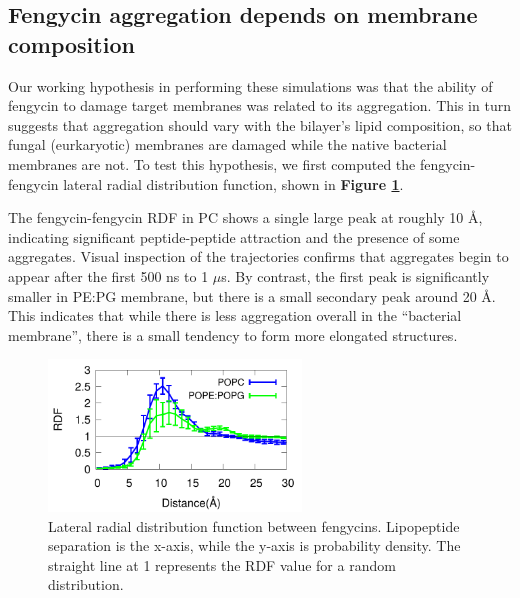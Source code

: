 \subsection{Fengycin aggregation depends on membrane composition}
\label{subsec:fengxyrdf}
Our working hypothesis in performing these simulations was that the ability of
fengycin to damage target membranes was related to its aggregation.\cite{HornGrossfield2013}
 This in turn suggests that aggregation should vary with the bilayer's
lipid composition, so that fungal (eurkaryotic) membranes are damaged while the
native bacterial membranes are not.  To test this hypothesis, we first computed
the fengycin-fengycin lateral radial distribution function, shown in \textbf{Figure \ref{fig:ch2_feng_feng}}.

The fengycin-fengycin RDF in PC shows a single large peak at roughly 10 {\AA},
indicating significant peptide-peptide attraction and the presence of some
aggregates. Visual inspection of the trajectories confirms that aggregates
begin to appear after the first 500 ns to 1 $\mu$s. By contrast, the first peak
is significantly smaller in PE:PG membrane, but there is a small secondary peak
around 20 {\AA.} This indicates that while there is less aggregation overall in
the ``bacterial membrane'', there is a small tendency to form more elongated
structures.

\begin{figure}
\centering
\includegraphics[width=0.6\textwidth]{chapter2_figs/feng_feng.pdf}
\caption{\label{fig:ch2_feng_feng} Lateral radial distribution function between
fengycins. Lipopeptide separation is the x-axis, while  the y-axis is
probability density. The straight line at 1 represents the RDF value for a
random distribution. }
\end{figure}

